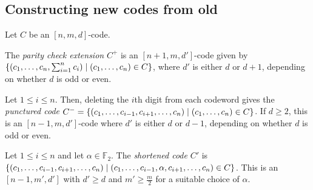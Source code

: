 \subsection{Constructing new codes from old}
Let \( C \) be an \( [n,m,d] \)-code.
\begin{example}
    The \emph{parity check extension} \( C^+ \) is an \( [n+1,m,d'] \)-code given by \( \qty{\qty(c_1, \dots, c_n, \sum_{i=1}^n c_i) \mid (c_1, \dots, c_n) \in C} \), where \( d' \) is either \( d \) or \( d + 1 \), depending on whether \( d \) is odd or even.
\end{example}
\begin{example}
    Let \( 1 \leq i \leq n \).
    Then, deleting the \( i \)th digit from each codeword gives the \emph{punctured code} \( C^- = \qty{(c_1, \dots, c_{i-1}, c_{i+1}, \dots, c_n) \mid (c_1, \dots, c_n) \in C} \).
    If \( d \geq 2 \), this is an \( [n-1, m, d'] \)-code where \( d' \) is either \( d \) or \( d - 1 \), depending on whether \( d \) is odd or even.
\end{example}
\begin{example}
    Let \( 1 \leq i \leq n \) and let \( \alpha \in \mathbb F_2 \).
    The \emph{shortened code} \( C' \) is \( \qty{(c_1, \dots, c_{i-1}, c_{i+1}, \dots, c_n) \mid (c_1, \dots, c_{i-1}, \alpha, c_{i+1}, \dots, c_n) \in C} \).
    This is an \( [n-1,m',d'] \) with \( d' \geq d \) and \( m' \geq \frac{m}{2} \) for a suitable choice of \( \alpha \).
\end{example}
